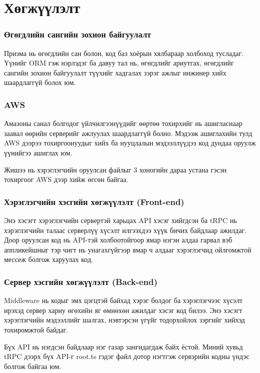 \section{Хөгжүүлэлт}
\subsubsection{Өгөгдлийн сангийн зохион байгуулалт}
Призма нь өгөгдлийн сан болон, код баз хоёрын хялбараар холбоход тусладаг. Үүнийг ORM гэж нэрлэдэг ба давуу тал нь, өгөгдлийг ариутгах, өгөгдлийг сангийн зохион байгуулалт түүхийг хадгалах зэрэг ажлыг инжинер хийх шаардлаггүй болох юм.


\subsubsection{AWS}
 Амазоны санал болгодог үйлчилгээнүүдийг өөртөө тохирхийг нь ашигласнаар заавал өөрийн серверийг ажлуулах шаардлаггүй болно. Мэдээж ашиглахийн тулд AWS дээрээ тохиргоонуудыг хийх ба нууцлалын мэдээллүүдээ код дундаа оруулж үүнийгээ ашиглах юм.

 Жишээ нь хэрэглэгчийн оруулсан файлыг 3 хоногийн дараа устана гэсэн тохиргоог AWS дээр хийж өгсөн байгаа.





\subsubsection[Front-end]{Хэрэглэгчийн хэсгийн хөгжүүлэлт (Front-end)}
Энэ хэсэгт хэрэглэгчийн сервертэй харьцах API хэсэг хийгдсэн ба tRPC нь хэрэглэгчийн талаас серверлүү хүсэлт илгээхдээ хүүк бичих байдлаар ажилдаг. Доор оруулсан код нь  API-тэй холбоотойгоор ямар нэгэн алдаа гарвал вэб аппликейшныг тэр чигт нь унагахгүйгээр ямар ч алдааг хэрэглэгчид ойлгомжтой мессеж болгож харуулах код.


\subsubsection[Back-end]{Сервер хэсгийн хөгжүүлэлт (Back-end)}
Middleware нь кодыг эмх цэгцтэй байхад хэрэг болдог ба хэрэглэгчээс хүсэлт ирэхэд сервер хариу өгөхийн яг өмнөхөн ажилдаг хэсэг код билээ. Энэ хэсэгт хэрэглэгчийн мэдээллийг шалгах, нэвтэрсэн үгүйг тодорхойлох зэргийг хийхэд тохиромжтой байдаг.

Бүх API нь нэгдсэн байдлаар нэг газар зангидагдаж байх ёстой. Миний хувьд tRPC дээрх бүх API-г root.ts гэдэг файл дотор нэгтгэж сервэрийн кодны үндэс болгож байгаа юм.
